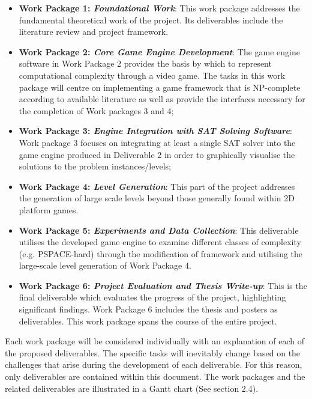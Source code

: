 \documentclass[a4paper]{article}
\begin{document}
\begin{itemize}

  \item \textbf{Work Package 1: \textit{Foundational Work}}: This work package addresses the fundamental theoretical work of the project. Its deliverables include the literature review and project framework.     \vspace{-3mm}
  \item \textbf{Work Package 2: \textit{Core Game Engine Development}}: The game engine software in Work Package 2 provides the basis by which to represent computational complexity through a video game. The tasks in this work package will centre on implementing a game framework that is NP-complete according to available literature as well as provide the interfaces necessary for the completion of Work packages 3 and 4;          \vspace{-3mm}

  \item \textbf{Work Package 3: \textit{Engine Integration with SAT Solving Software}}: Work package
   3 focuses on integrating at least a single SAT solver into the game engine produced in
   Deliverable 2 in order to graphically visualise the solutions to the problem
   instances/levels;\vspace{-3mm}


\item \textbf{Work Package 4: \textit{Level Generation}}: This part of the project addresses the generation of large scale levels beyond those generally found within 2D platform games.\vspace{-3mm}
  \item \textbf{Work Package 5: \textit{Experiments and Data Collection}}: This deliverable utilises the developed game engine to examine different classes of complexity (e.g. PSPACE-hard) through the modification of framework and utilising the large-scale level generation of Work Package 4.\vspace{-3mm}
  \item \textbf{Work Package 6: \textit{Project Evaluation and Thesis Write-up}}: This is the final deliverable which evaluates the progress of the project, highlighting significant findings. Work Package 6 includes the thesis and posters as deliverables. This work package spans the course of the entire project.


\end{itemize}

\noindent Each work package will be considered individually with an explanation of each of the proposed
deliverables. The specific tasks will inevitably change based on the challenges that arise during
the development of each deliverable. For this reason, only deliverables are contained within this
document. The work packages and the related deliverables are illustrated in a Gantt chart (See section
2.4).
\end{document}
